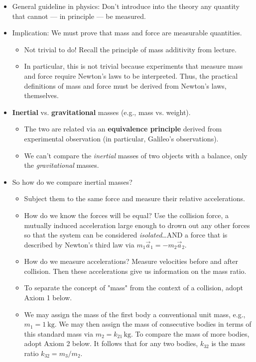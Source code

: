 \documentclass[../notes.tex]{subfiles}
\begin{document}
\begin{itemize}
    \item General guideline in physics: Don't introduce into the theory any quantity that cannot --- in principle --- be measured.
    \item Implication: We must prove that mass and force are measurable quantities.
    \begin{itemize}
        \item Not trivial to do! Recall the principle of mass additivity from lecture.
        \item In particular, this is not trivial because experiments that measure mass and force require Newton's laws to be interpreted. Thus, the practical definitions of mass and force must be derived from Newton's laws, themselves.
    \end{itemize}
    \item \textbf{Inertial} vs. \textbf{gravitational} masses (e.g., mass vs. weight).
    \begin{itemize}
        \item The two are related via an \textbf{equivalence principle} derived from experimental observation (in particular, Galileo's observations).
        \item We can't compare the \emph{inertial} masses of two objects with a balance, only the \emph{gravitational} masses.
    \end{itemize}
    \item So how do we compare inertial masses?
    \begin{itemize}
        \item Subject them to the same force and measure their relative accelerations.
        \item How do we know the forces will be equal? Use the collision force, a mutually induced acceleration large enough to drown out any other forces so that the system can be considered \emph{isolated}\dots AND a force that is described by Newton's third law via $m_1\vec{a}_1=-m_2\vec{a}_2$.
        \item How do we measure accelerations? Measure velocities before and after collision. Then these accelerations give us information on the mass ratio.
        \item To separate the concept of "mass" from the context of a collision, adopt Axiom 1 below.
        \item We may assign the mass of the first body a conventional unit mass, e.g., $m_1=\SI{1}{\kilo\gram}$. We may then assign the mass of consecutive bodies in terms of this standard mass via $m_2=k_{21}\,\si{\kilo\gram}$. To compare the mass of more bodies, adopt Axiom 2 below. It follows that for any two bodies, $k_{32}$ is the mass ratio $k_{32}=m_3/m_2$.

\end{itemize}
\end{itemize}
\end{document}
